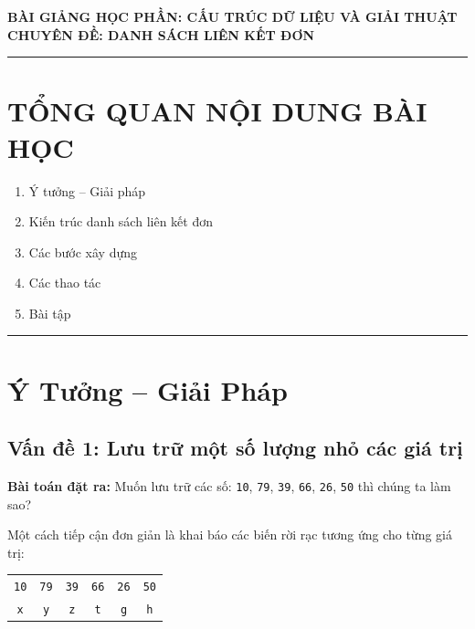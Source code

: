 \documentclass[12pt,a4paper]{article}
\begin{document}
\begin{center}
    {\large \textbf{BÀI GIẢNG HỌC PHẦN: CẤU TRÚC DỮ LIỆU VÀ GIẢI THUẬT}}\\[0.25em]
    {\LARGE \textbf{\color{codeblue}CHUYÊN ĐỀ: DANH SÁCH LIÊN KẾT ĐƠN}}\\[0.35em]
    \rule{\textwidth}{1pt}
\end{center}

\vspace{-0.6em}

\section*{TỔNG QUAN NỘI DUNG BÀI HỌC}
\begin{enumerate}[leftmargin=2.5em, itemsep=0.05em]
    \item Ý tưởng -- Giải pháp
    \item Kiến trúc danh sách liên kết đơn
    \item Các bước xây dựng
    \item Các thao tác
    \item Bài tập
\end{enumerate}

\vspace{0.4em}
\hrule
\vspace{0.8em}

\section{Ý Tưởng -- Giải Pháp}

\subsection{Vấn đề 1: Lưu trữ một số lượng nhỏ các giá trị}
\textbf{Bài toán đặt ra:} Muốn lưu trữ các số: \texttt{10}, \texttt{79}, \texttt{39}, \texttt{66}, \texttt{26}, \texttt{50} thì chúng ta làm sao?

\noindent Một cách tiếp cận đơn giản là khai báo các biến rời rạc tương ứng cho từng giá trị:
\begin{center}
\begin{tabular}{cccccc}
    \texttt{10} & \texttt{79} & \texttt{39} & \texttt{66} & \texttt{26} & \texttt{50} \\
    \texttt{x}  & \texttt{y}  & \texttt{z}  & \texttt{t}  & \texttt{g}  & \texttt{h}
\end{tabular}
\end{center}
\end{document}
